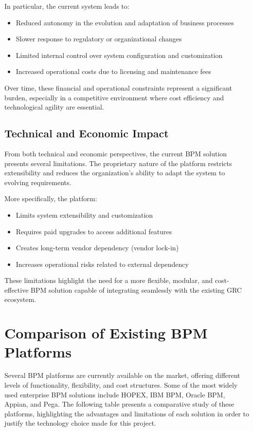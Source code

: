 In particular, the current system leads to:

\begin{itemize}
\item Reduced autonomy in the evolution and adaptation of business processes
\item Slower response to regulatory or organizational changes
\item Limited internal control over system configuration and customization
\item Increased operational costs due to licensing and maintenance fees
\end{itemize}

Over time, these financial and operational constraints represent a significant burden, especially in a competitive environment where cost efficiency and technological agility are essential.

\subsection{Technical and Economic Impact}

From both technical and economic perspectives, the current BPM solution presents several limitations. The proprietary nature of the platform restricts extensibility and reduces the organization's ability to adapt the system to evolving requirements.

More specifically, the platform:

\begin{itemize}
\item Limits system extensibility and customization
\item Requires paid upgrades to access additional features
\item Creates long-term vendor dependency (vendor lock-in)
\item Increases operational risks related to external dependency
\end{itemize}

These limitations highlight the need for a more flexible, modular, and cost-effective BPM solution capable of integrating seamlessly with the existing GRC ecosystem.

\section{Comparison of Existing BPM Platforms}

Several BPM platforms are currently available on the market, offering different levels of functionality, flexibility, and cost structures. Some of the most widely used enterprise BPM solutions include HOPEX, IBM BPM, Oracle BPM, Appian, and Pega. The following table presents a comparative study of these platforms, highlighting the advantages and limitations of each solution in order to justify the technology choice made for this project.


